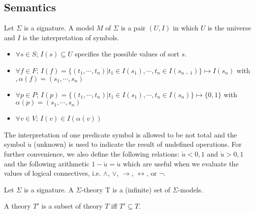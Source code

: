 \subsection{Semantics}

\begin{definition}
Let $\Sigma$ is a signature. A model $M$ of $\Sigma$ is a pair $(U, I)$ in which $U$ is the universe and $I$ is the interpretation of symbols.
\begin{itemize}
\item $\forall s \in S$; $I(s) \subseteq U$ specifies the possible values of sort $s$.
\item $\forall f \in F$; $I(f) = \{(t_1,\cdots, t_n)| t_1 \in I(s_1),\cdots, t_n \in I(s_{n-1})\} \mapsto I(s_n)$ with $, \alpha(f) = (s_1,\cdots, s_n)$
\item $\forall p \in P$; $I(p) = \{(t_1,\cdots, t_n)| t_1 \in I(s_1),\cdots, t_n \in I(s_n)\} \mapsto \{0, 1\}$ with $\alpha(p) = (s_1,\cdots, s_n)$
\item $\forall v \in V$; $I(v) \in I(\alpha(v))$
\end{itemize}
\end{definition}

The interpretation of one predicate symbol is allowed to be not total and the symbol $\mathring{u}$ (unknown) is used to indicate the result of undefined operations. For further convenience, we also define the following relations: $\mathring{u} < 0, 1$ and $\mathring{u} > 0, 1$ and the following arithmetic $1 - \mathring{u} = \mathring{u}$ which are useful when we evaluate the values of logical connectives, i.e. $\wedge$, $\vee$, $\rightarrow$, $\leftrightarrow$, or $\neg$. 

\begin{definition}
Let $\Sigma$ is a signature. A $\Sigma$-theory T is a (infinite) set of $\Sigma$-models.
\end{definition}
A theory $T'$ is a subset of theory $T$ iff $T' \subseteq T$.

